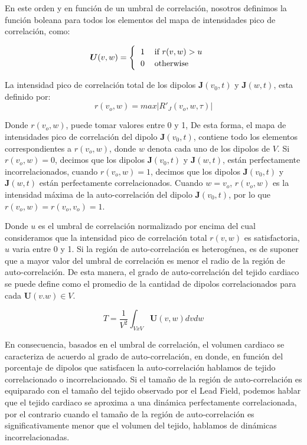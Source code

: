 En este orden y en función de un umbral de correlación, nosotros definimos la función boleana para todos los elementos del mapa de intensidades pico de correlación, como:

\begin{equation}
 \boldsymbol{U}(v,w)=
 \begin{cases}
    \begin{tabular}{ll}
        ${1}$ & if ${r}(v,w) > {u}$\\
        ${0}$ & otherwise
    \end{tabular}
 \end{cases}
\end{equation}

 La intensidad pico de correlación total de los  dipolos  $\mathbf{J}(v_0,t)$ y $\mathbf{J}(w,t)$, esta definido por:
\begin{equation}
{r}(v_o,w)  =max{|{R'_{J}}(v_o,w,\tau)|}
\end{equation}

Donde ${r}(v_o,w)$, puede tomar valores entre 0 y 1, De esta forma, el mapa de intensidades pico de correlación del dipolo $\mathbf{J}(v_0,t)$, contiene  todo los elementos correspondientes  a  ${r}(v_o,w)$,  donde $w$ denota cada uno de los dipolos de $V$. Si ${r}(v_o,w)=0$, decimos que los dipolos  $\mathbf{J}(v_0,t)$ y $\mathbf{J}(w,t)$, están perfectamente  incorrelacionados, cuando  ${r}(v_o,w)=1$, decimos que los dipolos  $\mathbf{J}(v_0,t)$ y $\mathbf{J}(w,t)$ están perfectamente correlacionados. Cuando  $w = v_o$, ${r}(v_o,w)$ es la intensidad máxima de la auto-correlación del dipolo $\mathbf{J}(v_0,t)$, por lo que ${r}(v_o,w)={r}(v_o,v_o)=1$.




Donde $u$ es el umbral de correlación  normalizado  por encima del cual  consideramos que la intensidad pico de correlación total ${r}(v,w)$ es satisfactoria, $u$ varia entre 0 y 1. Si la región de auto-correlación es heterogénea, es de suponer que a mayor valor del umbral de correlación es menor el radio de la región de auto-correlación. De esta manera, el grado de auto-correlación del tejido cardiaco  se puede define como el promedio de la cantidad de  dipolos  correlacionados  para cada $\mathbf{U}(v.w) \in V$.

\begin{equation}
{T}=\frac{1}{V^2}\int_{VxV}{\mathbf{U}(v,w){dvdw}}
\end{equation}

En consecuencia, basados en el umbral de correlación,  el volumen  cardiaco se
caracteriza de acuerdo al grado de auto-correlación,  en donde, en función del
porcentaje de dipolos que satisfacen la auto-correlación hablamos de  tejido
correlacionado o incorrelacionado. Si el tamaño de  la región de
auto-correlación  es equiparado  con el tamaño del tejido observado por el Lead
Field,  podemos hablar que el tejido cardiaco se aproxima a una dinámica
perfectamente  correlacionada, por el contrario cuando  el  tamaño  de la región
de auto-correlación  es significativamente menor que el volumen del  tejido,
hablamos de dinámicas incorrelacionadas.

